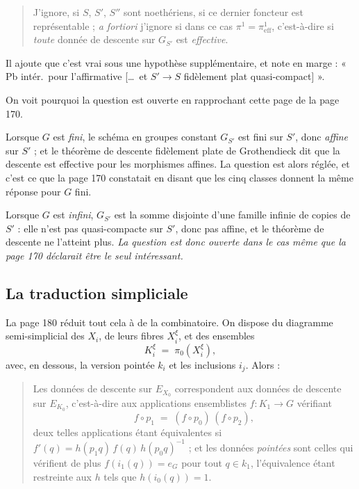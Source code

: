 \documentclass[11pt,a4paper]{article}
\begin{document}
\begin{quote}
J'ignore, si $S$, $S'$, $S''$ sont noethériens, si ce dernier foncteur est
représentable ; \emph{a fortiori} j'ignore si dans ce cas
$\pi^{1} = \pi^{1}_{\mathrm{eff}}$, c'est-à-dire si \emph{toute} donnée de
descente sur $G_{S'}$ est \emph{effective}.
\end{quote}

Il ajoute que c'est vrai sous une hypothèse supplémentaire, et note en marge :
« Pb intér.\ pour l'affirmative […\ et $S' \to S$ fidèlement plat
quasi-compact] ».

On voit pourquoi la question est ouverte en rapprochant cette page de la
page 170.

Lorsque $G$ est \emph{fini}, le schéma en groupes constant $G_{S'}$ est fini
sur $S'$, donc \emph{affine} sur $S'$ ; et le théorème de descente fidèlement
plate de Grothendieck dit que la descente est effective pour les
morphismes affines. La question est alors réglée, et c'est ce que la page 170
constatait en disant que les cinq classes donnent la même réponse pour $G$
fini.

Lorsque $G$ est \emph{infini}, $G_{S'}$ est la somme disjointe d'une famille
infinie de copies de $S'$ : elle n'est pas quasi-compacte sur $S'$, donc pas
affine, et le théorème de descente ne l'atteint plus. \emph{La question est
donc ouverte dans le cas même que la page 170 déclarait être le seul
intéressant.}

\subsection*{La traduction simpliciale}

La page 180 réduit tout cela à de la combinatoire. On dispose du diagramme
semi-simplicial des $X_{i}$, de leurs fibres $X_{i}^{\xi}$, et des ensembles
\[
  K_{i}^{\xi} \;=\; \pi_{0}(X_{i}^{\xi}) ,
\]
avec, en dessous, la version pointée $k_{i}$ et les inclusions $i_{j}$. Alors :

\begin{quote}
Les données de descente sur $E_{X_{0}}$ correspondent aux données de descente
sur $E_{K_{0}}$, c'est-à-dire aux applications ensemblistes
$f : K_{1} \to G$ vérifiant
\[
  f \circ p_{1} \;=\; (f \circ p_{0})\,(f \circ p_{2}) ,
\]
deux telles applications étant équivalentes si
$f'(q) = h(p_{1}q)\, f(q)\, h(p_{0}q)^{-1}$ ; et les données \emph{pointées}
sont celles qui vérifient de plus $f(i_{1}(q)) = e_{G}$ pour tout
$q \in k_{1}$, l'équivalence étant restreinte aux $h$ tels que
$h(i_{0}(q)) = 1$.
\end{quote}
\end{document}

